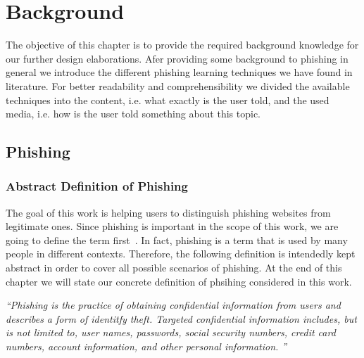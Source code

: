\section{Background}
\label{s:background}
The objective of this chapter is to provide the required background knowledge for our further design elaborations. 
Afer providing some background to phishing in general we introduce the different phishing learning techniques we have found in literature. 
For better readability and comprehensibility we divided the available techniques into the content, i.e. what exactly is the user told, and the used media, i.e. how is the user told something about this topic.


\subsection{Phishing}
\subsubsection{Abstract Definition of Phishing}
\label{s:phishing_def}
The goal of this work is helping users to distinguish phishing websites from legitimate ones. 
 Since phishing is important in the scope of this work, we are going to define the term first~\cite{jakobsson2006phishing}. In fact, phishing is a term that is used by many people in different contexts. Therefore, the following definition is intendedly kept abstract in order to cover all possible scenarios of phishing. At the end of this chapter we will state our concrete definition of phsihing considered in this work.

\begin{center}
\textit{``Phishing is the practice of obtaining confidential information from users and describes a form of identitfy theft.
 Targeted confidential information includes, but is not limited to, user names, passwords, social security numbers, credit card numbers, account information, and other personal information.
''}
\end{center}


